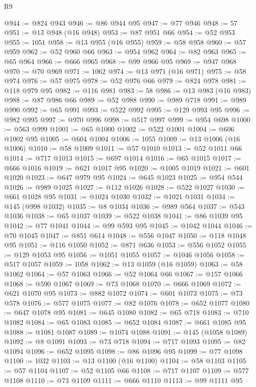 \begin{lexlean}{R9}
\begin{coremodule}
@944 := @824 @943
@946 := @86 @944 @95
@947 := @77 @946
@948 := 57
@951 := @13 @948 (@16 @948)
@953 := @87 @951 @66
@954 := @52 @953
@955 := 1051
@958 := @13 @955 (@16 @955)
@959 := @58 @958
@960 := @57 @959
@962 := @52 @960 @66
@963 := @954 @962
@964 := @82 @963
@965 := @65 @964
@966 := @666 @965
@968 := @99 @966 @95
@969 := @947 @968
@970 := @70 @969
@971 := 1062
@974 := @13 @971 (@16 @971)
@975 := @58 @974
@976 := @57 @975
@978 := @52 @976 @66
@979 := @824 @978
@981 := @118 @979 @95
@982 := @116 @981
@983 := 58
@986 := @13 @983 (@16 @983)
@988 := @87 @986 @66
@989 := @52 @988
@990 := @989 @718
@991 := @989 @990
@992 := @65 @991
@993 := @522 @992
@995 := @129 @993 @95
@996 := @982 @995
@997 := @970 @996
@998 := @517 @997
@999 := @954 @698
@1000 := @563 @999
@1001 := @65 @1000
@1002 := @522 @1001
@1004 := @606 @1002 @95
@1005 := @604 @1004
@1006 := 1055
@1009 := @13 @1006 (@16 @1006)
@1010 := @58 @1009
@1011 := @57 @1010
@1013 := @52 @1011 @66
@1014 := @717 @1013
@1015 := @697 @1014
@1016 := @65 @1015
@1017 := @666 @1016
@1019 := @621 @1017 @95
@1020 := @1005 @1019
@1021 := @601 @1020
@1023 := @647 @979 @95
@1024 := @645 @1023
@1025 := @954 @544
@1026 := @989 @1025
@1027 := @112 @1026
@1028 := @522 @1027
@1030 := @661 @1028 @95
@1031 := @1024 @1030
@1032 := @1021 @1031
@1034 := @145 (@998 @1032)
@1035 := @8 @1034
@1036 := @989 @564
@1037 := @543 @1036
@1038 := @65 @1037
@1039 := @522 @1038
@1041 := @86 @1039 @95
@1042 := @77 @1041
@1044 := @99 @593 @95
@1045 := @1042 @1044
@1046 := @70 @1045
@1047 := @851 @614
@1048 := @556 @1047
@1050 := @118 @1048 @95
@1051 := @116 @1050
@1052 := @871 @636
@1053 := @556 @1052
@1055 := @129 @1053 @95
@1056 := @1051 @1055
@1057 := @1046 @1056
@1058 := @517 @1057
@1059 := 1058
@1062 := @13 @1059 (@16 @1059)
@1063 := @58 @1062
@1064 := @57 @1063
@1066 := @52 @1064 @66
@1067 := @157 @1066
@1068 := @590 @1067
@1069 := @73 @1068
@1070 := @666 @1069
@1072 := @621 @1070 @95
@1073 := @882 @1072
@1074 := @601 @1073
@1075 := @73 @578
@1076 := @577 @1075
@1077 := @82 @1076
@1078 := @652 @1077
@1080 := @647 @1078 @95
@1081 := @645 @1080
@1082 := @65 @718
@1083 := @710 @1082
@1084 := @65 @1083
@1085 := @652 @1084
@1087 := @661 @1085 @95
@1088 := @1081 @1087
@1089 := @1074 @1088
@1091 := @145 (@1058 @1089)
@1092 := @8 @1091
@1093 := @73 @718
@1094 := @717 @1093
@1095 := @82 @1094
@1096 := @652 @1095
@1098 := @86 @1096 @95
@1099 := @77 @1098
@1100 := 1032
@1103 := @13 @1100 (@16 @1100)
@1104 := @58 @1103
@1105 := @57 @1104
@1107 := @52 @1105 @66
@1108 := @717 @1107
@1109 := @577 @1108
@1110 := @73 @1109
@1111 := @666 @1110
@1113 := @99 @1111 @95

\end{coremodule}
\end{lexlean}
